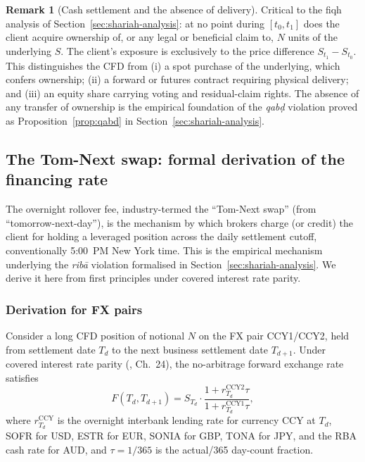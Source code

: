 \documentclass[preprint,12pt,authoryear]{elsarticle}
\theoremstyle{definition}
\newtheorem{remark}{Remark}[section]
\begin{document}
\begin{remark}[Cash settlement and the absence of delivery]
\label{rem:no-delivery}
Critical to the fiqh analysis of Section~\ref{sec:shariah-analysis}: at
no point during $[t_0, t_1]$ does the client acquire ownership of, or
any legal or beneficial claim to, $N$ units of the underlying $S$.
The client's exposure is exclusively to the price difference
$S_{t_1} - S_{t_0}$. This distinguishes the CFD from (i) a spot
purchase of the underlying, which confers ownership; (ii) a forward or
futures contract requiring physical delivery; and (iii) an equity share
carrying voting and residual-claim rights. The absence of any
transfer of ownership is the empirical foundation of the \emph{qab\d{d}}
violation proved as Proposition~\ref{prop:qabd} in
Section~\ref{sec:shariah-analysis}.
\end{remark}

\subsection{The Tom-Next swap: formal derivation of the financing rate}
\label{sec:tomnext}

The overnight rollover fee, industry-termed the ``Tom-Next swap''
(from ``tomorrow-next-day''), is the mechanism by which brokers
charge (or credit) the client for holding a leveraged position across
the daily settlement cutoff, conventionally 5:00~PM New York time.
This is the empirical mechanism underlying the \emph{rib\={a}}
violation formalised in Section~\ref{sec:shariah-analysis}. We derive
it here from first principles under covered interest rate parity.

\subsubsection{Derivation for FX pairs}
\label{sec:tomnext-fx}

Consider a long CFD position of notional $N$ on the FX pair CCY1/CCY2,
held from settlement date $T_d$ to the next business settlement date
$T_{d+1}$. Under covered interest rate parity (\citealp{Bjork2009},
Ch.~24), the no-arbitrage forward exchange rate satisfies
\begin{equation}
    F(T_d, T_{d+1})
    = S_{T_d} \cdot
      \frac{1 + r^{\text{CCY2}}_{T_d} \tau}
           {1 + r^{\text{CCY1}}_{T_d} \tau},
    \label{eq:cip-forward}
\end{equation}
where $r^{\text{CCY}}_{T_d}$ is the overnight interbank lending rate
for currency CCY at $T_d$, SOFR for USD, ESTR for EUR, SONIA for
GBP, TONA for JPY, and the RBA cash rate for AUD, and
$\tau = 1/365$ is the actual/365 day-count fraction.
\end{document}
